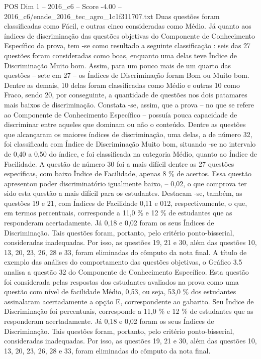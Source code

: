 \begin{textsample}{POS Dim 1 – 2016\_c6 – Score -4.00 – 2016\_c6/enade\_2016\_tec\_agro\_1c1f311707.txt}
Duas questões foram classificadas como Fácil, e outras cinco consideradas como Médio.
Já quanto aos índices de discriminação das questões objetivas do Componente de Conhecimento Específico da prova, tem -se como resultado a seguinte classificação : seis das 27 questões foram consideradas como boas, enquanto uma delas teve Índice de Discriminação Muito bom.
Assim, para um pouco mais de um quarto das questões – sete em 27 – os Índices de Discriminação foram Bom ou Muito bom.
Dentre as demais, 10 delas foram classificadas como Médio e outras 10 como Fraco, sendo 20, por conseguinte, a quantidade de questões nos dois patamares mais baixos de discriminação.
Constata -se, assim, que a prova – no que se refere ao Componente de Conhecimento Específico – possuía pouca capacidade de discriminar entre aqueles que dominam ou não o conteúdo.
Dentre as questões que alcançaram os maiores índices de discriminação, uma delas, a de número 32, foi classificada com Índice de Discriminação Muito bom, situando -se no intervalo de 0,40 a 0,50 do índice, e foi classificada na categoria Médio, quanto ao Índice de Facilidade.
A questão de número 30 foi a mais difícil dentre as 27 questões específicas, com baixo Índice de Facilidade, apenas 8 \% de acertos.
Essa questão apresentou poder discriminatório igualmente baixo, – 0,02, o que comprova ter sido esta questão a mais difícil para os estudantes.
Destacam -se, também, as questões 19 e 21, com Índices de Facilidade 0,11 e 012, respectivamente, o que, em termos percentuais, corresponde a 11,0 \% e 12 \% de estudantes que as responderam acertadamente.
Já 0,18 e 0,02 foram os seus Índices de Discriminação.
Tais questões foram, portanto, pelo critério ponto-bisserial, consideradas inadequadas.
Por isso, as questões 19, 21 e 30, além das questões 10, 13, 20, 23, 26, 28 e 33, foram eliminadas do cômputo da nota final.
A título de exemplo das análises do comportamento das questões objetivas, o Gráfico 3.5 analisa a questão 32 do Componente de Conhecimento Específico.
Esta questão foi considerada pelas respostas dos estudantes avaliados na prova como uma questão com nível de facilidade Médio, 0,53, ou seja, 53,0 \% dos estudantes assinalaram acertadamente a opção E, correspondente ao gabarito.
Seu Índice de Discriminação foi percentuais, corresponde a 11,0 \% e 12 \% de estudantes que as responderam acertadamente.
Já 0,18 e 0,02 foram os seus Índices de Discriminação.
Tais questões foram, portanto, pelo critério ponto-bisserial, consideradas inadequadas.
Por isso, as questões 19, 21 e 30, além das questões 10, 13, 20, 23, 26, 28 e 33, foram eliminadas do cômputo da nota final.

\end{textsample}
